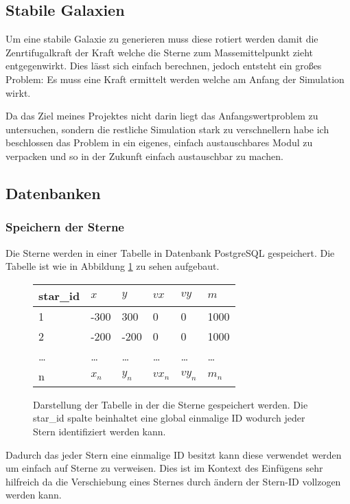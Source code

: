 \subsection{Stabile Galaxien}
Um eine stabile Galaxie zu generieren muss diese rotiert werden damit die
Zenrtifugalkraft der Kraft welche die Sterne zum Massemittelpunkt zieht
entgegenwirkt. Dies lässt sich einfach berechnen, jedoch entsteht ein großes
Problem: Es muss eine Kraft ermittelt werden welche am Anfang der Simulation
wirkt.

\par Da das Ziel meines Projektes nicht darin liegt das Anfangswertproblem zu
untersuchen, sondern die restliche Simulation stark zu verschnellern habe ich
beschlossen das Problem in ein eigenes, einfach austauschbares Modul zu
verpacken und so in der Zukunft einfach austauschbar zu machen.

\subsection{Datenbanken}

\subsubsection{Speichern der Sterne}

Die Sterne werden in einer Tabelle in Datenbank \mbox{PostgreSQL} gespeichert.
Die Tabelle ist wie in Abbildung \ref{fig:stars_table} zu sehen aufgebaut.

\begin{figure}[h!]
\centering
\begin{tabular} {l | l | l | l | l | l}
star\_id & \(x\) & \(y\) & \(vx\) & \(vy\) & \(m\) \\ \hline\hline
1        & -300 & 300 & 0  & 0  & 1000 \\ \hline
2        & -200 & -200 & 0  & 0  & 1000 \\ \hline
\dots   & \dots & \dots & \dots & \dots & \dots \\ \hline
n       & \(x_n\) & \(y_n\) & \(vx_n\)& \(vy_n\) & \(m_n\) \\ \hline
\end{tabular}
\caption{Darstellung der Tabelle in der die Sterne gespeichert werden. Die
star\_id spalte beinhaltet eine global einmalige ID wodurch jeder Stern
identifiziert werden kann.}
\label{fig:stars_table}
\end{figure}

Dadurch das jeder Stern eine einmalige ID besitzt kann diese verwendet werden
um einfach auf Sterne zu verweisen. Dies ist im Kontext des Einfügens sehr
hilfreich da die Verschiebung eines Sternes durch ändern der Stern-ID vollzogen
werden kann.

